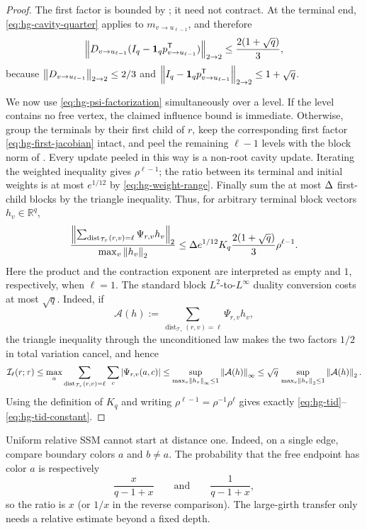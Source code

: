 \begin{proof}
The first factor is bounded by ; it need not
contract.  At the terminal end, \eqref{eq:hg-cavity-quarter} applies to
$m_{v\to u_{\ell-1}}$, and therefore
\begin{equation}
 \left\|D_{v\to u_{\ell-1}}
       (I_q-\mathbf1_qp_{v\to u_{\ell-1}}^{\mathsf T})\right\|_{2\to2}
 \le\frac{2(1+\sqrt q)}3,
 \label{eq:hg-terminal-bound}
\end{equation}
because $\left\|D_{v\to u_{\ell-1}}\right\|_{2\to2}\le2/3$ and
$\left\|I_q-\mathbf1_qp_{v\to u_{\ell-1}}^{\mathsf T}\right\|_{2\to2}\le1+\sqrt q$.

We now use \eqref{eq:hg-psi-factorization} simultaneously over a level.
If the level contains no free vertex, the claimed influence bound is
immediate.  Otherwise, group the terminals by their first child of $r$,
keep the corresponding
first factor \eqref{eq:hg-first-jacobian} intact, and peel the remaining
$\ell-1$ levels with the block norm of
.  Every update peeled in this way is a
non-root cavity update.  Iterating the weighted inequality gives
$\rho^{\ell-1}$; the ratio between its terminal and initial weights is at
most $e^{1/12}$ by \eqref{eq:hg-weight-range}.  Finally sum the at most
$\Delta$ first-child blocks by the triangle inequality.  Thus, for arbitrary
terminal block vectors $h_v\in\mathbb R^q$,
\[
 \frac{
  \left\|\sum_{\operatorname{dist}_{\mathcal T_\tau}(r,v)=\ell}
              \Psi_{r,v}h_v\right\|_2}
  {\max_v\left\|h_v\right\|_2}
 \le
 \Delta e^{1/12}K_q\frac{2(1+\sqrt q)}3\rho^{\ell-1}.
\]
Here the product and the contraction exponent are interpreted as empty and
$1$, respectively, when $\ell=1$.  The standard block
$L^2$-to-$L^\infty$ duality conversion costs at most $\sqrt q$.  Indeed, if
\[
 \mathcal A(h):=
 \sum_{\operatorname{dist}_{\mathcal T_\tau}(r,v)=\ell}
       \Psi_{r,v}h_v ,
\]
the triangle
inequality through the unconditioned law makes the two factors \(1/2\) in
total variation cancel, and hence
\[
 \mathcal I_\ell(r;\tau)
 \le \max_a
       \sum_{\operatorname{dist}_{\mathcal T_\tau}(r,v)=\ell}\sum_c
       \left|\Psi_{r,v}(a,c)\right|
 \le
 \sup_{\max_v\left\|h_v\right\|_\infty\le1}\left\|\mathcal A(h)\right\|_\infty
 \le
 \sqrt q\,
 \sup_{\max_v\left\|h_v\right\|_2\le1}\left\|\mathcal A(h)\right\|_2 .
\]
Using the definition of $K_q$ and writing
$\rho^{\ell-1}=\rho^{-1}\rho^\ell$ gives exactly
\eqref{eq:hg-tid}--\eqref{eq:hg-tid-constant}.
\end{proof}

Uniform relative SSM cannot start at distance one. Indeed, on a single
edge, compare boundary colors \(a\) and \(b\ne a\).  The probability that
the free endpoint has color \(a\) is respectively
\[
  \frac{x}{q-1+x}
  \qquad\text{and}\qquad
  \frac1{q-1+x},
\]
so the ratio is \(x\) (or \(1/x\) in the reverse comparison).  The
large-girth transfer only needs a relative estimate beyond a fixed depth.

